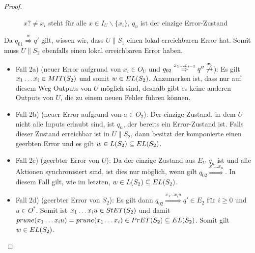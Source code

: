 \begin{proof}
\begin{itemize}
\begin{figure} [h!tbp]
\begin{center}
        \caption{$x?\neq x_i$ steht für alle $x\in I_U\backslash\{x_i\}$, $q_n$
          ist der einzige Error-Zustand}
        \label{UmitE}
      \end{center}
      \end{figure}
      Da $q_{01} \overset{w}{\Rightarrow} q'$ gilt, wissen wir, dass $U\|S_1$
      einen lokal erreichbaren Error hat. Somit muss $U\|S_2$ ebenfalls einen
      lokal erreichbaren Error haben.
      \begin{itemize}
        \item Fall 2a) (neuer Error aufgrund von $x_i\in O_U$ und $q_{02}
          \overset{x_1\dots x_{i-1}}{\Rightarrow} q''
          \overset{x_i}{\not{\hspace{-0.1cm}\rightarrow}}$): Es gilt $x_1\dots
          x_i\in MIT{}(S_2)$ und somit $w\in EL{}(S_2)$. Anzumerken ist, dass nur
          auf diesem Weg Outputs von $U$ möglich sind, deshalb gibt es keine
          anderen Outputs von $U$, die zu einem neuen Fehler führen können.
        \item Fall 2b) (neuer Error aufgrund von $a\in O_2$): Der einzige
          Zustand, in dem $U$ nicht alle Inputs erlaubt sind, ist $q_n$, der
          bereits ein Error-Zustand ist. Falls dieser Zustand erreichbar ist in
          $U\|S_2$, dann besitzt der komponierte \EIO{} einen geerbten Error und
          es gilt $w\in L(S_2)\subseteq EL{}(S_2)$.
        \item Fall 2c) (geerbter Error von $U$): Da der einzige Zustand aus
          $E_U$ $q_n$ ist und alle Aktionen synchronisiert sind, ist dies nur
          möglich, wenn gilt $q_{02} \overset{x_1\dots x_n}{\Rightarrow}$. In
          diesem Fall gilt, wie im letzten, $w\in L(S_2)\subseteq EL{}(S_2)$.
        \item Fall 2d) (geerbter Error von $S_2$): Es gilt dann $q_{02}
          \overset{x_1\dots x_iu}{\Rightarrow} q'\in E_2$ für $i\geq 0$ und
          $u\in O^*$. Somit ist $x_1\dots x_iu\in StET{}(S_2)$ und damit
          $prune{}(x_1\dots x_iu)=prune{}(x_1\dots x_i)\in PrET{}(S_2)\subseteq
          EL{}(S_2)$. Somit gilt $w\in EL{}(S_2)$.
      \end{itemize}
  \end{itemize}
\end{proof}

